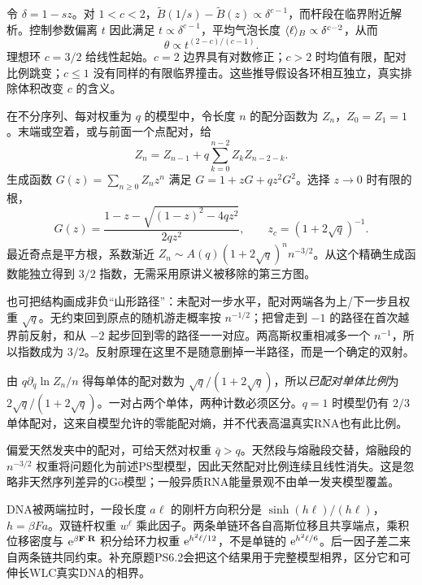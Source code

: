 令 $\delta=1-sz$。对 $1<c<2$，$\widetilde B(1/s)-\widetilde B(z)\propto\delta^{c-1}$，而杆段在临界附近解析。控制参数偏离 $t$ 因此满足 $t\propto\delta^{c-1}$，平均气泡长度 $\langle \ell\rangle_B\propto\delta^{c-2}$，从而
\[
\theta\propto t^{(2-c)/(c-1)}.
\]
理想环 $c=3/2$ 给线性起始。$c=2$ 边界具有对数修正；$c>2$ 时均值有限，配对比例跳变；$c\le1$ 没有同样的有限临界撞击。这些推导假设各环相互独立，真实排除体积改变 $c$ 的含义。

在不分序列、每对权重为 $q$ 的模型中，令长度 $n$ 的配分函数为 $Z_n$，$Z_0=Z_1=1$。末端或空着，或与前面一个点配对，给
\[
Z_n=Z_{n-1}+q\sum_{k=0}^{n-2}Z_kZ_{n-2-k}.
\]
生成函数 $G(z)=\sum_{n\ge0}Z_nz^n$ 满足 $G=1+zG+qz^2G^2$。选择 $z\to0$ 时有限的根，
\[
G(z)=\frac{1-z-\sqrt{(1-z)^2-4qz^2}}{2qz^2},\qquad
z_c=(1+2\sqrt q)^{-1}.
\]
最近奇点是平方根，系数渐近 $Z_n\sim A(q)(1+2\sqrt q)^n n^{-3/2}$。从这个精确生成函数能独立得到 $3/2$ 指数，无需采用原讲义被移除的第三方图。

也可把结构画成非负“山形路径”：未配对一步水平，配对两端各为上/下一步且权重 $\sqrt q$。无约束回到原点的随机游走概率按 $n^{-1/2}$；把曾走到 $-1$ 的路径在首次越界前反射，和从 $-2$ 起步回到零的路径一一对应。两高斯权重相减多一个 $n^{-1}$，所以指数成为 $3/2$。反射原理在这里不是随意删掉一半路径，而是一个确定的双射。

由 $q\partial_q\ln Z_n/n$ 得每单体的配对数为 $\sqrt q/(1+2\sqrt q)$，所以\emph{已配对单体比例}为 $2\sqrt q/(1+2\sqrt q)$。一对占两个单体，两种计数必须区分。$q=1$ 时模型仍有 $2/3$ 单体配对，这来自模型允许的零能配对熵，并不代表高温真实RNA也有此比例。

偏爱天然发夹中的配对，可给天然对权重 $\bar q>q$。天然段与熔融段交替，熔融段的 $n^{-3/2}$ 权重将问题化为前述PS型模型，因此天然配对比例连续且线性消失。这是忽略非天然序列差异的G\=o模型；一般异质RNA能量景观不由单一发夹模型覆盖。

DNA被两端拉时，一段长度 $a\ell$ 的刚杆方向积分是 $\sinh(h\ell)/(h\ell)$，$h=\beta Fa$。双链杆权重 $w^\ell$ 乘此因子。两条单链环各自高斯位移且共享端点，乘积位移密度与 $\mathrm e^{\beta\mathbf F\cdot\mathbf R}$ 积分给环力权重 $\mathrm e^{h^2\ell/12}$，不是单链的 $\mathrm e^{h^2\ell/6}$。后一因子差二来自两条链共同约束。补充原题PS6.2会把这个结果用于完整模型相界，区分它和可伸长WLC真实DNA的相界。
